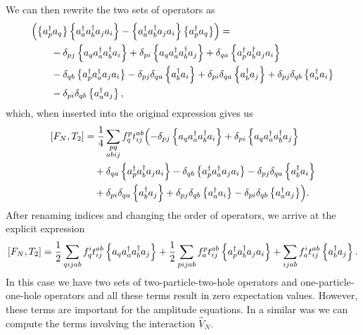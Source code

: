  We can then rewrite the two sets of operators as
    \begin{align*}
        & \Bigl( \left\{a^\dagger_p a_q\right\} \left\{a^\dagger_a a^\dagger_b a_j a_i\right\}
            - \left\{a^\dagger_a a^\dagger_b a_j a_i\right\} \left\{a^\dagger_p a_q\right\} \Bigr) = \\
        & \qquad - \delta_{pj} \left\{a_q a^\dagger_a a^\dagger_b a_i\right\}
        + \delta_{pi} \left\{a_q a^\dagger_a a^\dagger_b a_j\right\}
        + \delta_{qa} \left\{a^\dagger_p a^\dagger_b a_j a_i\right\} \\
        & \qquad - \delta_{qb}\left\{a^\dagger_p a^\dagger_a a_j a_i\right\} 
        - \delta_{pj} \delta_{qa} \left\{a^\dagger_b a_i\right\}
        + \delta_{pi} \delta_{qa} \left\{a^\dagger_b a_j\right\}
        + \delta_{pj} \delta_{qb} \left\{a^\dagger_a a_i\right\} \\
        & \qquad - \delta_{pi} \delta_{qb} \left\{a^\dagger_a a_j\right\},
    \end{align*}
which, when    inserted into the original expression gives us
    \begin{align*}
        \left[ F_N, T_2 \right]
        &= \frac{1}{4} \sum_{\substack{pq\\abij}} f_q^p t_{ij}^{ab} \Bigl(
        - \delta_{pj} \left\{a_q a^\dagger_a a^\dagger_b a_i\right\}
        + \delta_{pi} \left\{a_q a^\dagger_a a^\dagger_b a_j\right\} \\
        & \quad + \delta_{qa} \left\{a^\dagger_p a^\dagger_b a_j a_i\right\}
        - \delta_{qb}\left\{a^\dagger_p a^\dagger_a a_j a_i\right\} 
        - \delta_{pj} \delta_{qa} \left\{a^\dagger_b a_i\right\} \\
        & \quad + \delta_{pi} \delta_{qa} \left\{a^\dagger_b a_j\right\}
        + \delta_{pj} \delta_{qb} \left\{a^\dagger_a a_i\right\}
        - \delta_{pi} \delta_{qb} \left\{a^\dagger_a a_j\right\} \Bigr).
    \end{align*}
    After renaming indices and changing the order of operators, we arrive at the explicit expression
    \[
        \left[ F_N, T_2 \right]
        = \frac{1}{2} \sum_{qijab} f_q^i t_{ij}^{ab} \left\{a_q a^\dagger_a a^\dagger_b a_j\right\}
        + \frac{1}{2} \sum_{pijab} f_a^p t_{ij}^{ab} \left\{a^\dagger_p a^\dagger_b a_j a_i\right\}+ \sum_{ijab} f_a^i t_{ij}^{ab} \left\{a^\dagger_b a_j\right\}. 
    \]
In this case we have two sets of two-particle-two-hole operators and one-particle-one-hole operators and all these terms result in zero expectation values. 
However, these terms are important for the amplitude equations.  
In a similar was we can compute the terms involving the interaction $\hat{V}_N$.  
